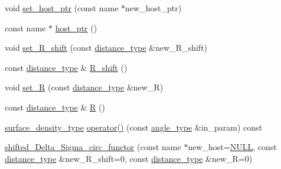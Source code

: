 \begin{DoxyCompactItemize}
\item 
void \hyperlink{classIceBRG_1_1shifted__Delta__Sigma__circ__functor_aa1117aedc52287f70d3f796509ec0817}{set\-\_\-host\-\_\-ptr} (const name $\ast$new\-\_\-host\-\_\-ptr)
\item 
const name $\ast$ \hyperlink{classIceBRG_1_1shifted__Delta__Sigma__circ__functor_a18ef46f183c85ad06c222ddd101cedf2}{host\-\_\-ptr} ()
\item 
void \hyperlink{classIceBRG_1_1shifted__Delta__Sigma__circ__functor_a907c0e414ca0f9b9bf189382c2cd6ed5}{set\-\_\-\-R\-\_\-shift} (const \hyperlink{namespaceIceBRG_a45499647eb87e24c10ab32c628711cec}{distance\-\_\-type} \&new\-\_\-\-R\-\_\-shift)
\item 
const \hyperlink{namespaceIceBRG_a45499647eb87e24c10ab32c628711cec}{distance\-\_\-type} \& \hyperlink{classIceBRG_1_1shifted__Delta__Sigma__circ__functor_aefc2f32724d679232d602655626fbf86}{R\-\_\-shift} ()
\item 
void \hyperlink{classIceBRG_1_1shifted__Delta__Sigma__circ__functor_ac612029c9d4ac39c5b2a30fb0b3a81a4}{set\-\_\-\-R} (const \hyperlink{namespaceIceBRG_a45499647eb87e24c10ab32c628711cec}{distance\-\_\-type} \&new\-\_\-\-R)
\item 
const \hyperlink{namespaceIceBRG_a45499647eb87e24c10ab32c628711cec}{distance\-\_\-type} \& \hyperlink{classIceBRG_1_1shifted__Delta__Sigma__circ__functor_a2d4c8d7d12a07a3a29c3778b9a764e08}{R} ()
\item 
\hyperlink{namespaceIceBRG_a80c597ef5ba0a32491d32a9f0083b02d}{surface\-\_\-density\-\_\-type} \hyperlink{classIceBRG_1_1shifted__Delta__Sigma__circ__functor_a73db85ee276a18beca470f655e021e79}{operator()} (const \hyperlink{namespaceIceBRG_a688eeb0811a2474b20b667ed2e9625a1}{angle\-\_\-type} \&in\-\_\-param) const 
\item 
\hyperlink{classIceBRG_1_1shifted__Delta__Sigma__circ__functor_a74b4bb7c374c036239d4fa180d9a4661}{shifted\-\_\-\-Delta\-\_\-\-Sigma\-\_\-circ\-\_\-functor} (const name $\ast$new\-\_\-host=\hyperlink{lib_2IceBRG__main_2common_8h_a070d2ce7b6bb7e5c05602aa8c308d0c4}{N\-U\-L\-L}, const \hyperlink{namespaceIceBRG_a45499647eb87e24c10ab32c628711cec}{distance\-\_\-type} \&new\-\_\-\-R\-\_\-shift=0, const \hyperlink{namespaceIceBRG_a45499647eb87e24c10ab32c628711cec}{distance\-\_\-type} \&new\-\_\-\-R=0)
\end{DoxyCompactItemize}


